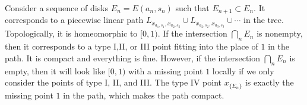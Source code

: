     Consider a sequence of disks \(E_n = E(a_n,s_n)\) such that \(E_{n+1} \subset E_n\).
    It corresponds to a piecewise linear path \(L_{x_{a_1,s_1}, x_{a_2,s_2}} \cup L_{x_{a_2,s_2}, x_{a_3,s_3}} \cup \cdots\) in the tree.
    Topologically, it is homeomorphic to \([0,1)\).
    If the intersection \(\bigcap_n E_n\) is nonempty, then it corresponds to a type I,II, or III point fitting into the place of \(1\) in the path.
    It is compact and everything is fine.
    However, if the intersection \(\bigcap_n E_n\) is empty, then it will look like \([0,1)\) with a missing point \(1\) locally if we only consider the points of type I, II, and III.
    The type IV point \(x_{\{E_n\}}\) is exactly the missing point \(1\) in the path, which makes the path compact.
    
    \begin{figure}[ht]
        \centering
\end{figure}
